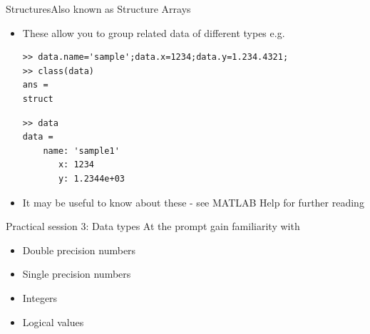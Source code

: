 \documentclass{beamer}
\begin{document}
\begin{frame}[fragile]{Structures}{Also known as Structure Arrays}
	\begin{itemize}
		\item These allow you to group related data of different types e.g.
		
		\begin{lstlisting}[style=Matlab-editor]
>> data.name='sample';data.x=1234;data.y=1.234.4321;
>> class(data)
ans = 
struct
		\end{lstlisting}
		\begin{lstlisting}[style=Matlab-bw]
>> data
data = 
    name: 'sample1'
       x: 1234
       y: 1.2344e+03 
		\end{lstlisting}	
		\item It may be useful to know about these - see MATLAB Help for further reading
	\end{itemize}
\end{frame}

\begin{frame}{Practical session 3: Data types}
	At the prompt gain familiarity with
	\begin{itemize}
		\item Double precision numbers
		\item Single precision numbers
		\item Integers
		\item Logical values
	\end{itemize}
\end{frame}
\end{document}
